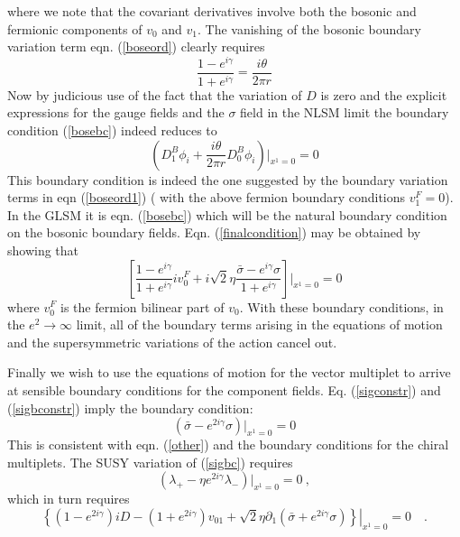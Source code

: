 \documentclass[a4paper,12pt]{article}
\begin{document}
where we note that the covariant derivatives involve both the bosonic and
fermionic components of $v_0$ and $v_1$. 
The vanishing of the bosonic boundary variation term eqn. (\ref{boseord})
clearly requires
\begin{equation}
\frac{1-e^{i\gamma}}{1+e^{i\gamma}}=\frac{i\theta}{2\pi r}
\end{equation}
Now by judicious use of the fact that the variation of $D$ is zero and
the explicit expressions for the gauge fields and the $\sigma$ field in
the NLSM limit the boundary condition (\ref{bosebc}) indeed reduces  
to 
\begin{equation}
\left(D_1^B\phi_i+
\frac{i\theta}{2\pi r}D_0^B \phi_i\right)|_{x^1=0}=0
\label{finalcondition}
\end{equation}
This boundary condition is indeed the one suggested by the boundary
variation terms in eqn (\ref{boseord1}) ( with the above fermion
boundary conditions $v_1^F=0$). 
In the GLSM it is eqn. (\ref{bosebc}) which will be the natural
boundary condition on the bosonic boundary fields.  
%
Eqn. (\ref{finalcondition}) may be obtained by showing that 
\begin{equation}
\left[\frac{1-e^{i\gamma}}{1+e^{i\gamma}}iv_0^F
+i{\sqrt 2}\eta
\frac{{\bar \sigma}-e^{i\gamma}\sigma}{1+e^{i\gamma}}
\right]|_{x^1=0}=0
\label{other}
\end{equation} 
where $v_0^F$ is the fermion bilinear part of $v_0$. 
With these boundary conditions, in the $e^2 \rightarrow\infty$ limit,
all of the boundary terms arising in the 
equations of motion and the supersymmetric variations of the action
cancel out. 

Finally we wish to use the equations of motion
for the vector multiplet to arrive at sensible
boundary conditions for the component fields.
Eq. (\ref{sigconstr}) and (\ref{sigbconstr}) imply the boundary condition:
\begin{equation}
({\bar \sigma}-e^{2i\gamma}\sigma)|_{x^1=0}=0
\label{sigbc}
\end{equation}
This is consistent with eqn. (\ref{other}) and the boundary conditions
for the chiral multiplets.
The SUSY variation of (\ref{sigbc}) requires 
\begin{equation}
(\lambda_+-\eta e^{2i\gamma}\lambda_-)|_{x^1=0}=0\ ,
\label{lambdabc}
\end{equation}
which in turn requires
\begin{equation}
\left.\left\{(1-e^{2i\gamma})iD-(1+e^{2i\gamma})v_{01}
+{\sqrt 2}\eta \partial_1({\bar \sigma}+e^{2i\gamma}\sigma)
\right\}\right|_{x^1=0}=0 \quad.
\end{equation}
\end{document}
